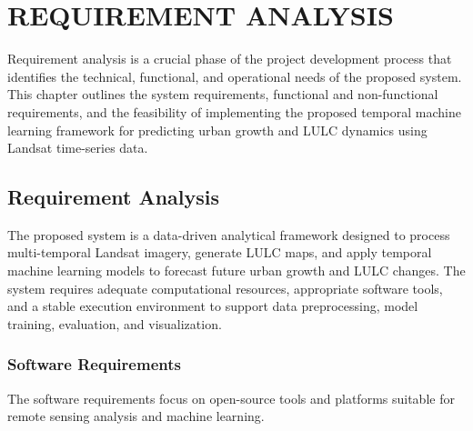 \documentclass[main]{subfiles}
\begin{document}
\chapter{\MakeUppercase{REQUIREMENT ANALYSIS}}

Requirement analysis is a crucial phase of the project development process that identifies the technical, functional, and operational needs of the proposed system. This chapter outlines the system requirements, functional and non-functional requirements, and the feasibility of implementing the proposed temporal machine learning framework for predicting urban growth and LULC dynamics using Landsat time-series data.

\section{Requirement Analysis}
The proposed system is a data-driven analytical framework designed to process multi-temporal Landsat imagery, generate LULC maps, and apply temporal machine learning models to forecast future urban growth and LULC changes. The system requires adequate computational resources, appropriate software tools, and a stable execution environment to support data preprocessing, model training, evaluation, and visualization.

\subsection{Software Requirements}
The software requirements focus on open-source tools and platforms suitable for remote sensing analysis and machine learning.
\end{document}
